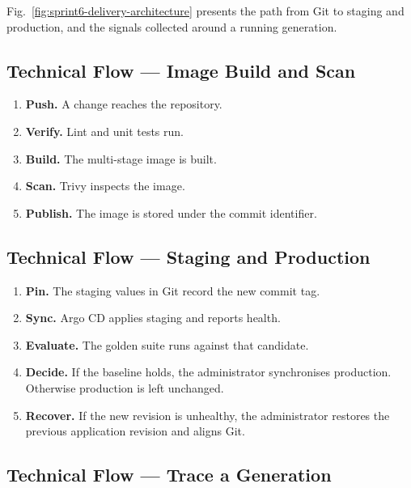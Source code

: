 Fig.~\ref{fig:sprint6-delivery-architecture} presents the path from Git to staging and production, and the signals collected around a running generation.


\subsection{Technical Flow --- Image Build and Scan}

\begin{enumerate}[label=\arabic*.,leftmargin=2em]
  \item \textbf{Push.} A change reaches the repository.
  \item \textbf{Verify.} Lint and unit tests run.
  \item \textbf{Build.} The multi-stage image is built.
  \item \textbf{Scan.} Trivy inspects the image.
  \item \textbf{Publish.} The image is stored under the commit identifier.
\end{enumerate}

\subsection{Technical Flow --- Staging and Production}

\begin{enumerate}[label=\arabic*.,leftmargin=2em]
  \item \textbf{Pin.} The staging values in Git record the new commit tag.
  \item \textbf{Sync.} Argo CD applies staging and reports health.
  \item \textbf{Evaluate.} The golden suite runs against that candidate.
  \item \textbf{Decide.} If the baseline holds, the administrator synchronises production. Otherwise production is left unchanged.
  \item \textbf{Recover.} If the new revision is unhealthy, the administrator restores the previous application revision and aligns Git.
\end{enumerate}

\subsection{Technical Flow --- Trace a Generation}


